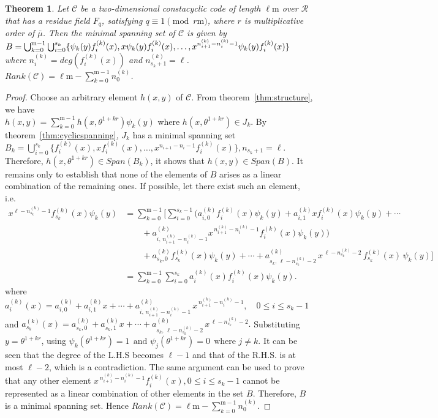 \documentclass[12pt,a4paper]{article}
\newtheorem{theorem}{Theorem}[section]
\begin{document}
\begin{theorem}\label{thm:rank}
        Let $\mathscr{C}$ be a two-dimensional constacyclic code of length $\ell\mathrm{m}$ over $\mathcal{R}$ that has a residue field $F_q$, satisfying $q \equiv 1 \pmod{r\mathrm{m}}$, where $r$ is multiplicative order of $\bar{\mu}$. Then the minimal spanning set of $\mathscr{C}$ is given by $B=\bigcup_{k=0}^{\mathrm{m}-1}\bigcup_{i=0}^{s_k}\{\psi_k(y)f_i^{(k)}(x), x\psi_k(y)f_i^{(k)}(x),  \dots, \\ x^{n_{i+1}^{(k)}-n_i^{(k)}-1}\psi_k(y)f_i^{(k)}(x) \}$ where $n_i^{(k)}=deg(f_i^{(k)}(x))$ and ${n_{s_k+1}^{(k)}}={\ell}$. $Rank(\mathscr{C})= \ell\mathrm{m}-\sum_{k=0}^{\mathrm{m}-1}n_0^{(k)}$.
\end{theorem}
\begin{proof}
    Choose an arbitrary element $h(x,y)$ of $\mathscr{C}$. From theorem~\ref{thm:structure}, we have\\ $h(x,y)= \sum_{k=0}^{\mathrm{m}-1}h(x,\theta^{1+kr})\psi_k(y)$ where $h(x,\theta^{1+kr}) \in J_k$. By theorem~\ref{thm:cyclicspanning}, $J_k$ has a minimal spanning set $B_k= \bigcup_{i=0}^{s_k}\{ f_i^{(k)}(x), xf_i^{(k)}(x), \dots , x^{n_{i+1}-n_i-1}f_i^{(k)}(x)\}, n_{s_k+1}= \ell$. Therefore, $h(x,\theta^{1+kr}) \in Span(B_k)$, it shows that $h(x,y) \in Span(B)$. It remains only to establish that none of the elements of $B$ arises as a linear combination of the remaining ones. If possible, let there exist such an element, i.e.
\[
\begin{aligned}
x^{\ell-n^{(k)}_{s_k}-1} f^{(k)}_{s_k}(x)\psi_k(y)
&= \sum_{k=0}^{\mathrm{m}-1}\Bigg[
   \sum_{i=0}^{s_k-1}\Big(
   a^{(k)}_{i,0} f^{(k)}_i(x)\psi_k(y)
   + a^{(k)}_{i,1} x f^{(k)}_i(x)\psi_k(y)
   + \cdots \\
&\qquad
   + a^{(k)}_{i,\,n^{(k)}_{i+1}-n^{(k)}_i-1}
     x^{\,n^{(k)}_{i+1}-n^{(k)}_i-1}
     f^{(k)}_i(x)\psi_k(y)
   \Big) \\
&\qquad
   + a^{(k)}_{s_k,0} f^{(k)}_{s_k}(x)\psi_k(y)
   + \cdots +a^{(k)}_{s_k,\,\ell-n^{(k)}_{s_k}-2}\,
x^{\,\ell-n^{(k)}_{s_k}-2}\,f^{(k)}_{s_k}(x)\,\psi_k(y) \Bigg] \\
&= \sum_{k=0}^{\mathrm{m}-1}\sum_{i=0}^{s_k}
   a^{(k)}_i(x) f^{(k)}_i(x)\psi_k(y).
\end{aligned}
\]
where $
a^{(k)}_{i}(x)
=
a^{(k)}_{i,0}+a^{(k)}_{i,1}x+\cdots
+a^{(k)}_{i,\,n^{(k)}_{i+1}-n^{(k)}_{i}-1}\,x^{\,n^{(k)}_{i+1}-n^{(k)}_{i}-1},
\quad 0\le i\le s_k-1$ and $
a^{(k)}_{s_k}(x)
=
a^{(k)}_{s_k,0}+a^{(k)}_{s_k,1}x+\cdots
+a^{(k)}_{s_k,\,\ell-n^{(k)}_{s_k}-2}\,x^{\,\ell-n^{(k)}_{s_k}-2}.$ Substituting $y=\theta^{1+kr}$, using $\psi_k(\theta^{1+kr})=1 ~~\text{and  } \psi_j(\theta^{1+kr})=0 ~~\text{where  } j \ne k$. It can be seen that the degree of the L.H.S becomes $\ell-1$ and that of the R.H.S. is at most $\ell-2$, which is a contradiction. The same argument can be used to prove that any other element $x^{\,n^{(k)}_{i+1}-n^{(k)}_i-1}f^{(k)}_i(x), 0 \le i \le s_k-1$ cannot be represented as a linear combination of other elements in the set $B$. Therefore, $B$ is a minimal spanning set. Hence $Rank(\mathscr{C})=\ell\mathrm{m}-\sum_{k=0}^{\mathrm{m}-1}n_0^{(k)}$.
\end{proof}
\end{document}

